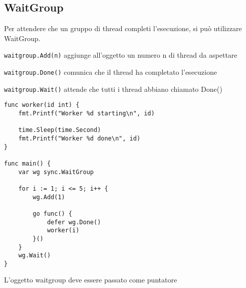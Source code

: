 \subsection{WaitGroup}
Per attendere che un gruppo di thread completi l'esecuzione, si può utilizzare WaitGroup.

\begin{sitemize}
    \item \texttt{waitgroup.Add(n)} aggiunge all'oggetto un numero n di thread da aspettare
    \item \texttt{waitgroup.Done()} comunica che il thread ha completato l'esecuzione
    \item \texttt{waitgroup.Wait()} attende che tutti i thread abbiano chiamato Done()
\end{sitemize}

\begin{verbatim}
func worker(id int) {
    fmt.Printf("Worker %d starting\n", id)

    time.Sleep(time.Second)
    fmt.Printf("Worker %d done\n", id)
}

func main() {
    var wg sync.WaitGroup

    for i := 1; i <= 5; i++ {
        wg.Add(1)

        go func() {
            defer wg.Done()
            worker(i)
        }()
    }
    wg.Wait()
}
\end{verbatim}

\begin{note}
    L'oggetto waitgroup deve essere passato come puntatore
\end{note}
